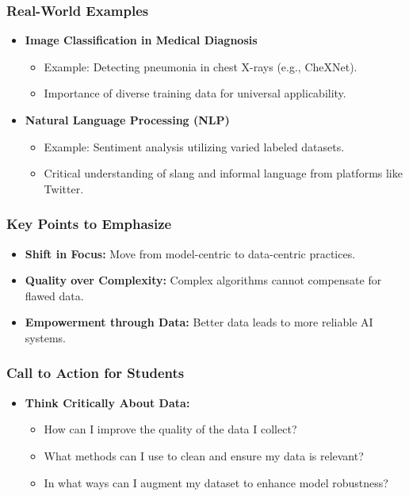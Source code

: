 \documentclass[aspectratio=169]{beamer}
\begin{document}
\begin{frame}[fragile]
    \frametitle{Real-World Examples}
    \begin{itemize}
        \item \textbf{Image Classification in Medical Diagnosis}
            \begin{itemize}
                \item Example: Detecting pneumonia in chest X-rays (e.g., CheXNet).
                \item Importance of diverse training data for universal applicability.
            \end{itemize}
        \item \textbf{Natural Language Processing (NLP)}
            \begin{itemize}
                \item Example: Sentiment analysis utilizing varied labeled datasets.
                \item Critical understanding of slang and informal language from platforms like Twitter.
            \end{itemize}
    \end{itemize}
\end{frame}

\begin{frame}[fragile]
    \frametitle{Key Points to Emphasize}
    \begin{itemize}
        \item \textbf{Shift in Focus:} Move from model-centric to data-centric practices.
        \item \textbf{Quality over Complexity:} Complex algorithms cannot compensate for flawed data.
        \item \textbf{Empowerment through Data:} Better data leads to more reliable AI systems.
    \end{itemize}
\end{frame}

\begin{frame}[fragile]
    \frametitle{Call to Action for Students}
    \begin{itemize}
        \item \textbf{Think Critically About Data:}
            \begin{itemize}
                \item How can I improve the quality of the data I collect?
                \item What methods can I use to clean and ensure my data is relevant?
                \item In what ways can I augment my dataset to enhance model robustness?
            \end{itemize}
    \end{itemize}
\end{frame}
\end{document}
